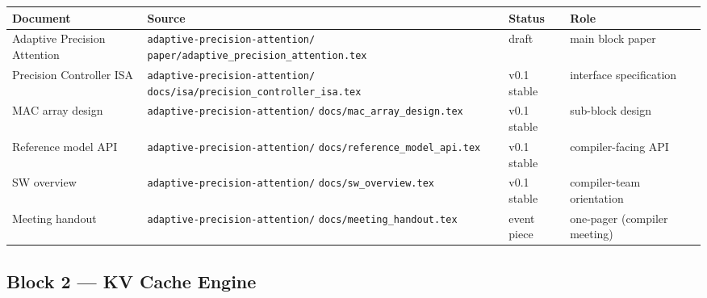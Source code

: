 \documentclass[11pt]{article}
\begin{document}
\begin{center}
\renewcommand{\arraystretch}{1.2}
\setlength{\tabcolsep}{4pt}
\begin{tabular}{@{}p{}p{}lp{}@{}}
\toprule
\textbf{Document} & \textbf{Source} & \textbf{Status} & \textbf{Role} \\
\midrule
Adaptive Precision Attention & \texttt{adaptive-precision-attention/}
                                \texttt{paper/adaptive\_precision\_attention.tex}
  & draft  & main block paper \\
Precision Controller ISA     & \texttt{adaptive-precision-attention/}
                                \texttt{docs/isa/precision\_controller\_isa.tex}
  & v0.1 stable & interface specification \\
MAC array design             & \texttt{adaptive-precision-attention/}
                                \texttt{docs/mac\_array\_design.tex}
  & v0.1 stable & sub-block design \\
Reference model API          & \texttt{adaptive-precision-attention/}
                                \texttt{docs/reference\_model\_api.tex}
  & v0.1 stable & compiler-facing API \\
SW overview                  & \texttt{adaptive-precision-attention/}
                                \texttt{docs/sw\_overview.tex}
  & v0.1 stable & compiler-team orientation \\
Meeting handout              & \texttt{adaptive-precision-attention/}
                                \texttt{docs/meeting\_handout.tex}
  & event piece & one-pager (compiler meeting) \\
\bottomrule
\end{tabular}
\end{center}

\subsection{Block 2 --- KV Cache Engine}
\end{document}
